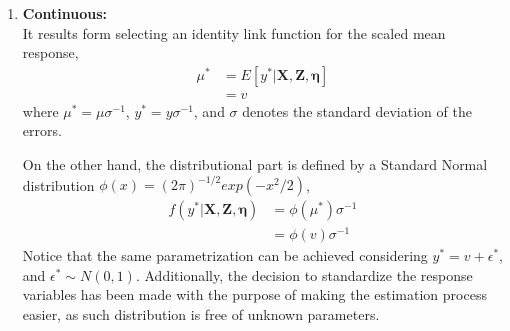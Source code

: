 \begin{enumerate}
	
	\item \textbf{Continuous:} \\
	It results form selecting an identity link function for the scaled mean response,
	\begin{equation} \label{eq:link_cont}
		\begin{split}
		\mu^{*} &= E[y^{*} | \mathbf{X}, \mathbf{Z}, \pmb{\eta}] \\ 
		&= v
		\end{split}
	\end{equation}
	where $\mu^{*} = \mu \sigma^{-1}$, $y^{*} = y \sigma^{-1}$, and $\sigma$ denotes the standard deviation of the errors.
	
	On the other hand, the distributional part is defined by a Standard Normal distribution $\phi(x)=(2 \pi)^{-1/2} exp(-x^{2}/2)$,
	\begin{equation} \label{eq:dist_cont}
		\begin{split}
		f(y^{*}| \mathbf{X}, \mathbf{Z}, \pmb{\eta}) &= \phi(\mu^{*}) \sigma^{-1} \\
		&= \phi(v) \sigma^{-1}
		\end{split}
	\end{equation}
	Notice that the same parametrization can be achieved considering $y^{*} = v + \epsilon^{*}$, and $\epsilon^{*} \sim N(0, 1)$.
	Additionally, the decision to standardize the response variables has been made with the purpose of making the estimation process easier, as such distribution is free of unknown parameters.
	
	
	

\end{enumerate}
